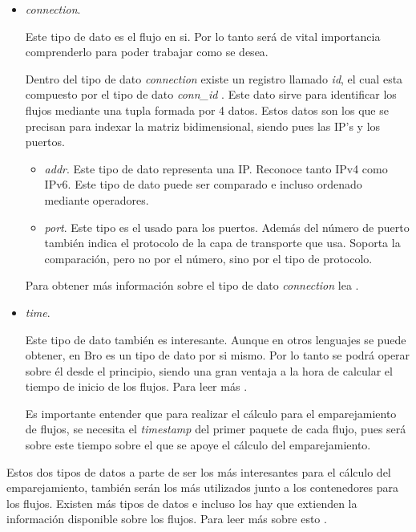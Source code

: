\begin{itemize}

\item \textit{connection}. 

\intro Este tipo de dato es el flujo en si. Por lo tanto será de vital importancia comprenderlo para poder trabajar 
como se desea.

\intro Dentro del tipo de dato \textit{connection} existe un registro llamado \textit{id}, el cual esta 
compuesto por el tipo de dato \textit{conn\_id} \cite{broconnid}. Este dato sirve para identificar los flujos 
mediante una tupla formada por 4 datos. Estos datos son los que se precisan para indexar la matriz bidimensional, 
siendo pues las IP's y los puertos.

  \begin{itemize}

  \item \textit{addr}. Este tipo de dato representa una IP. Reconoce tanto IPv4 como IPv6. Este tipo de dato puede 
  ser comparado e incluso ordenado mediante operadores. \cite{broaddr}

  \item \textit{port}. Este tipo es el usado para los puertos. Además del número de puerto también indica el 
  protocolo de la capa de transporte que usa. Soporta la comparación, pero no por el número, sino por el tipo de 
  protocolo. \cite{broport}
  \end{itemize}
  
\intro Para obtener más información sobre el tipo de dato \textit{connection} lea \cite{connectiontype}.

\item \textit{time}. 

\intro Este tipo de dato también es interesante. Aunque en otros lenguajes se puede obtener, 
en Bro es un tipo de dato por si mismo. Por lo tanto se podrá operar sobre él desde el principio, siendo una gran 
ventaja a la hora de calcular el tiempo de inicio de los flujos. Para leer más \cite{timetype}. 

\intro Es importante entender que para realizar el cálculo para el emparejamiento de flujos, se necesita el 
\textit{timestamp} del primer paquete de cada flujo, pues será sobre este tiempo sobre el que se apoye el 
cálculo del emparejamiento.

\end{itemize}

\intro Estos dos tipos de datos a parte de ser los más interesantes para el cálculo del emparejamiento, también 
serán los más utilizados junto a los contenedores para los flujos. Existen más tipos de datos e incluso los hay que 
extienden la información disponible sobre los flujos. Para leer más sobre esto \cite{conntype}.
